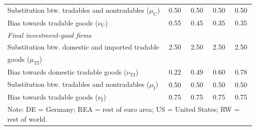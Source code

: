 \begin{table}[htbp]
\begin{tabular}{lcccc}
    Substitution btw. tradables and nontradables ($\mu_{\text{C}}$) & 0.50 & 0.50 & 0.50 & 0.50 \\
    Bias towards tradable goods ($\nu_{\text{C}}$) & 0.55 & 0.45 & 0.35 & 0.35 \\
    \multicolumn{5}{l}{\textit{Final investment-good firms}} \\
    Substitution btw. domestic and imported tradable & 2.50 & 2.50 & 2.50 & 2.50 \\
    \quad goods ($\mu_{\text{TI}}$) &  &  &  &  \\
    Bias towards domestic tradable goods ($\nu_{\text{TI}}$) & 0.22 & 0.49 & 0.60 & 0.78 \\
    Substitution btw. tradables and nontradables ($\mu_{\text{I}}$) & 0.50 & 0.50 & 0.50 & 0.50 \\
    Bias towards tradable goods ($\nu_{\text{I}}$) & 0.75 & 0.75 & 0.75 & 0.75 \\
    \hline
    \multicolumn{5}{p{0.9\linewidth}}{Note: DE = Germany; REA = rest of euro area; US = United States; RW = rest of world.}
    \end{tabular}
\end{table}